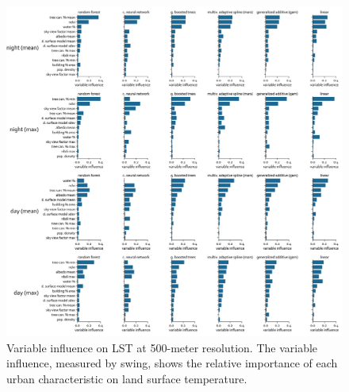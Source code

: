 \documentclass[final,3p,times,onecolumn,sort&compress]{elsarticle}
\begin{document}
\begin{figure}[h]
    \begin{center}
    \includegraphics[width=\linewidth]{fig/report/importance_500.png}
    \caption[Variable influence on LST at 500-meter resolution]{
    Variable influence on LST at 500-meter resolution.
    The variable influence, measured by swing, shows the relative importance of each urban characteristic on land surface temperature.}
    \label{fig:importance_500}
    \end{center}
\end{figure}


\clearpage
\end{document}
